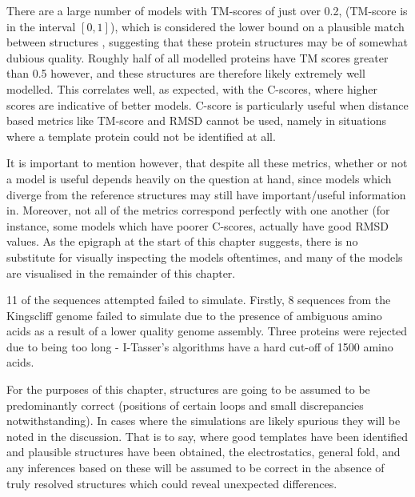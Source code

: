 There are a large number of models with TM-scores of just over 0.2, (TM-score is in the interval $[0,1]$), which is considered the lower bound on a plausible match between structures \citep{Zhang2005}, suggesting that these protein structures may be of somewhat dubious quality. Roughly half of all modelled proteins have TM scores greater than 0.5 however, and these structures are therefore likely extremely well modelled. This correlates well, as expected, with the C-scores, where higher scores are indicative of better models. C-score is particularly useful when distance based metrics like TM-score and RMSD cannot be used, namely in situations where a template protein could not be identified at all.

It is important to mention however, that despite all these metrics, whether or not a model is useful depends heavily on the question at hand, since models which diverge from the reference structures may still have important/useful information in. Moreover, not all of the metrics correspond perfectly with one another (for instance, some models which have poorer C-scores, actually have good RMSD values. As the epigraph at the start of this chapter suggests, there is no substitute for visually inspecting the models oftentimes, and many of the models are visualised in the remainder of this chapter.

11 of the sequences attempted failed to simulate. Firstly, 8 sequences from the \Pasy{} Kingscliff genome failed to simulate due to the presence of ambiguous amino acids as a result of a lower quality genome assembly. Three proteins were rejected due to being too long - I-Tasser's algorithms have a hard cut-off of 1500 amino acids. 

For the purposes of this chapter, structures are going to be assumed to be predominantly correct (positions of certain loops and small discrepancies notwithstanding). In cases where the simulations are likely spurious they will be noted in the discussion. That is to say, where good templates have been identified and plausible structures have been obtained, the electrostatics, general fold, and any inferences based on these will be assumed to be correct in the absence of truly resolved structures which could reveal unexpected differences.

\clearpage
